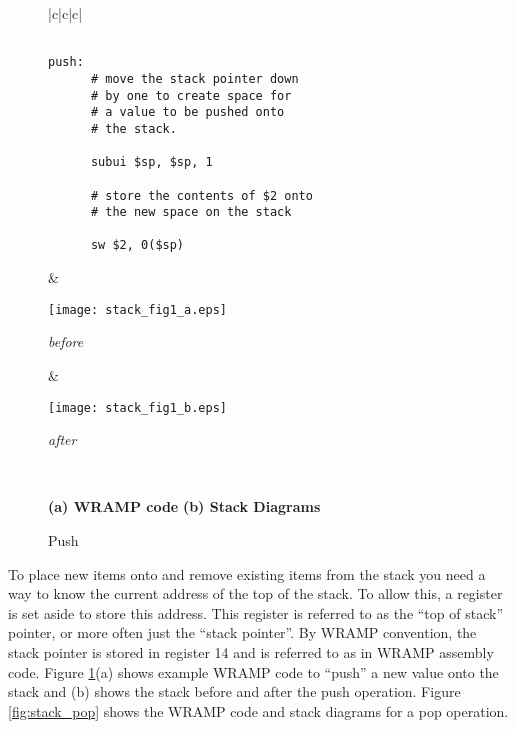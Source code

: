 %
%
\begin{figure}[!hb]
\begin{center}
\begin{footnotesize}
\begin{tabular}{|c|c|c|}

\hline
\begin{minipage}[l]{7cm}
\vspace{\topsep}
\begin{verbatim}

push:
      # move the stack pointer down
      # by one to create space for 
      # a value to be pushed onto 
      # the stack.

      subui $sp, $sp, 1

      # store the contents of $2 onto
      # the new space on the stack

      sw $2, 0($sp)

\end{verbatim}
\end{minipage}
&
\begin{minipage}[c]{3.5cm}
\begin{center}
\texttt{[image: stack\_fig1\_a.eps]}

\emph{before}\\
\end{center}
\end{minipage}

&
\begin{minipage}[c]{3.5cm}
\begin{center}
\texttt{[image: stack\_fig1\_b.eps]}


\emph{after}\\
\end{center}
\end{minipage}
\\
\hline
\end{tabular}
\begin{center}
\small{
\textbf{(a) WRAMP code}
\hspace{3.5cm}
\textbf{(b) Stack Diagrams}
}
\end{center}

\caption{Push}
\label{fig:stack_push}
\end{footnotesize}
\end{center}
\end{figure}
%
%

To place new items onto and remove existing items from the stack you
need a way to know the current address of the top of the stack. To
allow this, a register is set aside to store this address. This
register is referred to as the ``top of stack'' pointer, or more often
just the ``stack pointer''. By WRAMP convention, the stack pointer is stored
in register 14 and is referred to as  in WRAMP assembly code.
Figure \ref{fig:stack_push}(a) shows example WRAMP code to ``push'' a new
value onto the stack and (b) shows the stack before and after the push operation. Figure \ref{fig:stack_pop} shows the WRAMP code and stack diagrams for a pop
operation.

